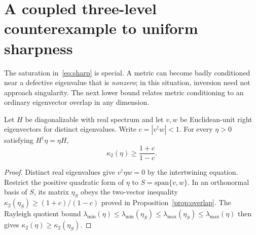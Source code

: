 \section{A coupled three-level counterexample to uniform sharpness}
The saturation in~\eqref{eq:sharp} is special. A metric can become badly
conditioned near a defective eigenvalue that is \emph{nonzero}; in this
situation, inversion need not approach singularity. The next lower bound
relates metric conditioning to an ordinary eigenvector overlap in any
dimension.

\begin{lemma}
\label{lem:overlapn}
Let $H$ be diagonalizable with real spectrum and let $v,w$ be
Euclidean-unit right eigenvectors for distinct eigenvalues. Write
$c=|v^\dagger w|<1$. For every $\eta>0$ satisfying
$H^\dagger\eta=\eta H$,
\begin{equation}\label{eq:overlapn}
 \kappa_2(\eta)\geq\frac{1+c}{1-c}.
\end{equation}
\end{lemma}
\begin{proof}
Distinct real eigenvalues give $v^\dagger\eta w=0$ by the
intertwining equation. Restrict the positive quadratic form of $\eta$
to $S=\mathrm{span}\{v,w\}$. In an orthonormal basis of $S$, its
matrix $\eta_S$ obeys the two-vector inequality
$\kappa_2(\eta_S)\geq(1+c)/(1-c)$ proved in
Proposition~\ref{prop:overlap}. The Rayleigh quotient bound
$\lambda_{\min}(\eta)\leq\lambda_{\min}(\eta_S)
\leq\lambda_{\max}(\eta_S)\leq\lambda_{\max}(\eta)$
then gives $\kappa_2(\eta)\geq\kappa_2(\eta_S)$.
\end{proof}

